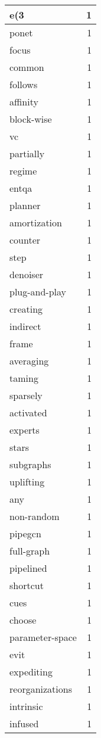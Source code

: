 \begin{table}[h]
\begin{tabular}{|l|r|}
\hline
e(3 & 1 \\
\hline
ponet & 1 \\
\hline
focus & 1 \\
\hline
common & 1 \\
\hline
follows & 1 \\
\hline
affinity & 1 \\
\hline
block-wise & 1 \\
\hline
vc & 1 \\
\hline
partially & 1 \\
\hline
regime & 1 \\
\hline
entqa & 1 \\
\hline
planner & 1 \\
\hline
amortization & 1 \\
\hline
counter & 1 \\
\hline
step & 1 \\
\hline
denoiser & 1 \\
\hline
plug-and-play & 1 \\
\hline
creating & 1 \\
\hline
indirect & 1 \\
\hline
frame & 1 \\
\hline
averaging & 1 \\
\hline
taming & 1 \\
\hline
sparsely & 1 \\
\hline
activated & 1 \\
\hline
experts & 1 \\
\hline
stars & 1 \\
\hline
subgraphs & 1 \\
\hline
uplifting & 1 \\
\hline
any & 1 \\
\hline
non-random & 1 \\
\hline
pipegcn & 1 \\
\hline
full-graph & 1 \\
\hline
pipelined & 1 \\
\hline
shortcut & 1 \\
\hline
cues & 1 \\
\hline
choose & 1 \\
\hline
parameter-space & 1 \\
\hline
evit & 1 \\
\hline
expediting & 1 \\
\hline
reorganizations & 1 \\
\hline
intrinsic & 1 \\
\hline
infused & 1 \\

\end{tabular}
\end{table}
